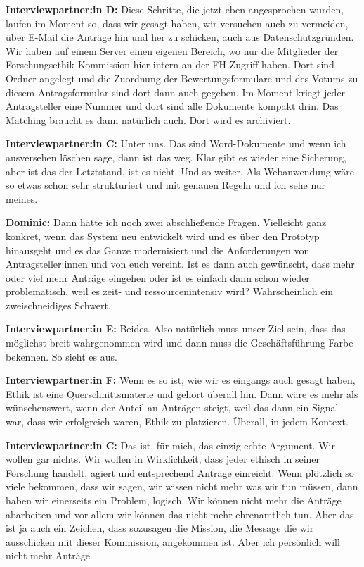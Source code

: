 \documentclass[a4paper,12pt,twoside,numbers=noendperiod]{scrreprt}
\begin{document}
\textbf{Interviewpartner:in D:} Diese Schritte, die jetzt eben angesprochen wurden, laufen im Moment so, dass wir gesagt haben, wir versuchen auch zu vermeiden, über E-Mail die Anträge hin und her zu schicken, auch aus Datenschutzgründen. Wir haben auf einem Server einen eigenen Bereich, wo nur die Mitglieder der Forschungsethik-Kommission hier intern an der FH Zugriff haben. Dort sind Ordner angelegt und die Zuordnung der Bewertungsformulare und des Votums zu diesem Antragsformular sind dort dann auch gegeben. Im Moment kriegt jeder Antragsteller eine Nummer und dort sind alle Dokumente kompakt drin. Das Matching braucht es dann natürlich auch. Dort wird es archiviert.

\textbf{Interviewpartner:in C:} Unter uns. Das sind Word-Dokumente und wenn ich ausversehen löschen sage, dann ist das weg. Klar gibt es wieder eine Sicherung, aber ist das der Letztstand, ist es nicht. Und so weiter. Als Webanwendung wäre so etwas schon sehr strukturiert und mit genauen Regeln und ich sehe nur meines.

\textbf{Dominic:} Dann hätte ich noch zwei abschließende Fragen. Vielleicht ganz konkret, wenn das System neu entwickelt wird und es über den Prototyp hinausgeht und es das Ganze modernisiert und die Anforderungen von Antragsteller:innen und von euch vereint. Ist es dann auch gewünscht, dass mehr oder viel mehr Anträge eingehen oder ist es einfach dann schon wieder problematisch, weil es zeit- und ressourcenintensiv wird? Wahrscheinlich ein zweischneidiges Schwert.

\textbf{Interviewpartner:in E:} Beides. Also natürlich muss unser Ziel sein, dass das möglichst breit wahrgenommen wird und dann muss die Geschäftsführung Farbe bekennen. So sieht es aus.

\textbf{Interviewpartner:in F:} Wenn es so ist, wie wir es eingangs auch gesagt haben, Ethik ist eine Querschnittsmaterie und gehört überall hin. Dann wäre es mehr als wünschenswert, wenn der Anteil an Anträgen steigt, weil das dann ein Signal war, dass wir erfolgreich waren, Ethik zu platzieren. Überall, in jedem Kontext.

\textbf{Interviewpartner:in C:} Das ist, für mich, das einzig echte Argument. Wir wollen gar nichts. Wir wollen in Wirklichkeit, dass jeder ethisch in seiner Forschung handelt, agiert und entsprechend Anträge einreicht. Wenn plötzlich so viele bekommen, dass wir sagen, wir wissen nicht mehr was wir tun müssen, dann haben wir einerseits ein Problem, logisch. Wir können nicht mehr die Anträge abarbeiten und vor allem wir können das nicht mehr ehrenamtlich tun. Aber das ist ja auch ein Zeichen, dass sozusagen die Mission, die Message die wir ausschicken mit dieser Kommission, angekommen ist. Aber ich persönlich will nicht mehr Anträge.
\end{document}
